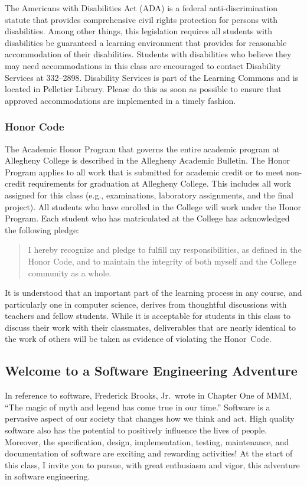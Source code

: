 \documentclass[11pt]{article}
\begin{document}
The Americans with Disabilities Act (ADA) is a federal anti-discrimination statute that provides comprehensive civil
rights protection for persons with disabilities. Among other things, this legislation requires all students with
disabilities be guaranteed a learning environment that provides for reasonable accommodation of their disabilities.
Students with disabilities who believe they may need accommodations in this class are encouraged to contact Disability
Services at 332--2898. Disability Services is part of the Learning Commons and is located in Pelletier Library.
Please do this as soon as possible to ensure that approved accommodations are implemented in a timely fashion.

\subsubsection*{Honor Code}

The Academic Honor Program that governs the entire academic program at Allegheny College is described in the Allegheny
Academic Bulletin. The Honor Program applies to all work that is submitted for academic credit or to meet non-credit
requirements for graduation at Allegheny College. This includes all work assigned for this class (e.g., examinations,
laboratory assignments, and the final project). All students who have enrolled in the College will work under the Honor
Program. Each student who has matriculated at the College has acknowledged the following pledge:

\begin{quote}
  I hereby recognize and pledge to fulfill my responsibilities, as defined in the Honor Code, and to maintain the
  integrity of both myself and the College community as a whole.
\end{quote}

\noindent It is understood that an important part of the learning process in any course, and particularly one in
computer science, derives from thoughtful discussions with teachers and fellow students. While it is acceptable for
students in this class to discuss their work with their classmates, deliverables that are nearly identical to the work
of others will be taken as evidence of violating the \mbox{Honor Code}.

\subsection*{Welcome to a Software Engineering Adventure}

In reference to software, Frederick Brooks, Jr.\ wrote in Chapter One of MMM, ``The magic of myth and legend has come
true in our time.'' Software is a pervasive aspect of our society that changes how we think and act. High quality
software also has the potential to positively influence the lives of people. Moreover, the specification, design,
implementation, testing, maintenance, and documentation of software are exciting and rewarding activities! At the start
of this class, I invite you to pursue, with great enthusiasm and vigor, this adventure in software engineering.
\end{document}
